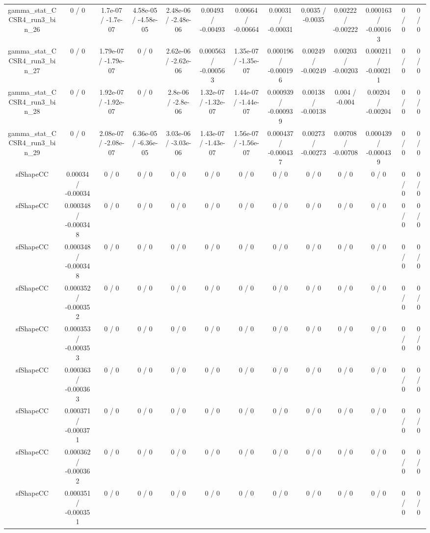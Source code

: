 \documentclass[10pt]{article}
\begin{document}
\begin{table}[htbp]
\begin{center}
\begin{tabular}{|c|c|c|c|c|c|c|c|c|c|c|c|c|}
  gamma_stat_CCSR4_run3_bin_26 & 0 / 0 & 1.7e-07 / -1.7e-07 & 4.58e-05 / -4.58e-05 & 2.48e-06 / -2.48e-06 & 0.00493 / -0.00493 & 0.00664 / -0.00664 & 0.00031 / -0.00031 & 0.0035 / -0.0035 & 0.00222 / -0.00222 & 0.000163 / -0.000163 & 0 / 0 & 0 / 0 \\ 
  gamma_stat_CCSR4_run3_bin_27 & 0 / 0 & 1.79e-07 / -1.79e-07 & 0 / 0 & 2.62e-06 / -2.62e-06 & 0.000563 / -0.000563 & 1.35e-07 / -1.35e-07 & 0.000196 / -0.000196 & 0.00249 / -0.00249 & 0.00203 / -0.00203 & 0.000211 / -0.000211 & 0 / 0 & 0 / 0 \\ 
  gamma_stat_CCSR4_run3_bin_28 & 0 / 0 & 1.92e-07 / -1.92e-07 & 0 / 0 & 2.8e-06 / -2.8e-06 & 1.32e-07 / -1.32e-07 & 1.44e-07 / -1.44e-07 & 0.000939 / -0.000939 & 0.00138 / -0.00138 & 0.004 / -0.004 & 0.00204 / -0.00204 & 0 / 0 & 0 / 0 \\ 
  gamma_stat_CCSR4_run3_bin_29 & 0 / 0 & 2.08e-07 / -2.08e-07 & 6.36e-05 / -6.36e-05 & 3.03e-06 / -3.03e-06 & 1.43e-07 / -1.43e-07 & 1.56e-07 / -1.56e-07 & 0.000437 / -0.000437 & 0.00273 / -0.00273 & 0.00708 / -0.00708 & 0.000439 / -0.000439 & 0 / 0 & 0 / 0 \\ 
  sfShapeCC & 0.00034 / -0.00034 & 0 / 0 & 0 / 0 & 0 / 0 & 0 / 0 & 0 / 0 & 0 / 0 & 0 / 0 & 0 / 0 & 0 / 0 & 0 / 0 & 0 / 0 \\ 
  sfShapeCC & 0.000348 / -0.000348 & 0 / 0 & 0 / 0 & 0 / 0 & 0 / 0 & 0 / 0 & 0 / 0 & 0 / 0 & 0 / 0 & 0 / 0 & 0 / 0 & 0 / 0 \\ 
  sfShapeCC & 0.000348 / -0.000348 & 0 / 0 & 0 / 0 & 0 / 0 & 0 / 0 & 0 / 0 & 0 / 0 & 0 / 0 & 0 / 0 & 0 / 0 & 0 / 0 & 0 / 0 \\ 
  sfShapeCC & 0.000352 / -0.000352 & 0 / 0 & 0 / 0 & 0 / 0 & 0 / 0 & 0 / 0 & 0 / 0 & 0 / 0 & 0 / 0 & 0 / 0 & 0 / 0 & 0 / 0 \\ 
  sfShapeCC & 0.000353 / -0.000353 & 0 / 0 & 0 / 0 & 0 / 0 & 0 / 0 & 0 / 0 & 0 / 0 & 0 / 0 & 0 / 0 & 0 / 0 & 0 / 0 & 0 / 0 \\ 
  sfShapeCC & 0.000363 / -0.000363 & 0 / 0 & 0 / 0 & 0 / 0 & 0 / 0 & 0 / 0 & 0 / 0 & 0 / 0 & 0 / 0 & 0 / 0 & 0 / 0 & 0 / 0 \\ 
  sfShapeCC & 0.000371 / -0.000371 & 0 / 0 & 0 / 0 & 0 / 0 & 0 / 0 & 0 / 0 & 0 / 0 & 0 / 0 & 0 / 0 & 0 / 0 & 0 / 0 & 0 / 0 \\ 
  sfShapeCC & 0.000362 / -0.000362 & 0 / 0 & 0 / 0 & 0 / 0 & 0 / 0 & 0 / 0 & 0 / 0 & 0 / 0 & 0 / 0 & 0 / 0 & 0 / 0 & 0 / 0 \\ 
  sfShapeCC & 0.000351 / -0.000351 & 0 / 0 & 0 / 0 & 0 / 0 & 0 / 0 & 0 / 0 & 0 / 0 & 0 / 0 & 0 / 0 & 0 / 0 & 0 / 0 & 0 / 0 \\ 

\end{tabular}
\end{center}
\end{table}
\end{document}

